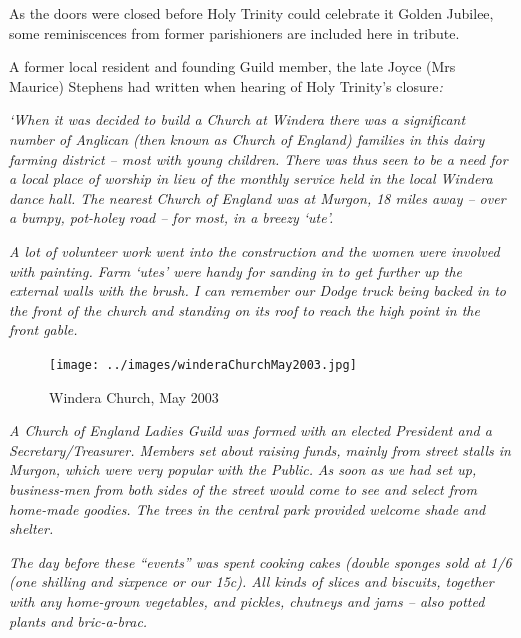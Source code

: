 As the doors were closed before Holy Trinity could celebrate it Golden Jubilee, some reminiscences from former parishioners are included here in tribute.



A former local resident and founding Guild member, the late Joyce (Mrs Maurice) Stephens had written when hearing of Holy Trinity's closure\emph{:}



\emph{`When it was decided to build a Church at Windera there was a significant number of Anglican (then known as Church of England) families in this dairy farming district -- most with young children. There was thus seen to be a need for a local place of worship in lieu of the monthly service held in the local Windera dance hall. The nearest Church of England was at Murgon, 18 miles away -- over a bumpy, pot-holey road -- for most, in a breezy `ute'.}



\emph{A lot of volunteer work went into the construction and the women were involved with painting. Farm `utes' were handy for sanding in to get further up the external walls with the brush. I can remember our Dodge truck being backed in to the front of the church and standing on its roof to reach the high point in the front gable.}









\begin{figure}[!htb]
\begin{center}
\texttt{[image: ../images/winderaChurchMay2003.jpg]}
\caption{Windera Church, May 2003}
\end{center}
\end{figure}




\emph{A Church of England Ladies Guild was formed with an elected President and a Secretary/Treasurer. Members set about raising funds, mainly from street stalls in Murgon, which were very popular with the Public.} \emph{As soon as we had set up, business-men from both sides of the street would come to see and select from home-made goodies. The trees in the central park provided welcome shade and shelter.}



\emph{The day before these ``events'' was spent cooking cakes (double sponges sold at 1/6 (one shilling and sixpence or our 15c). All kinds of slices and biscuits, together with any home-grown vegetables, and pickles, chutneys and jams -- also potted plants and bric-a-brac.}



